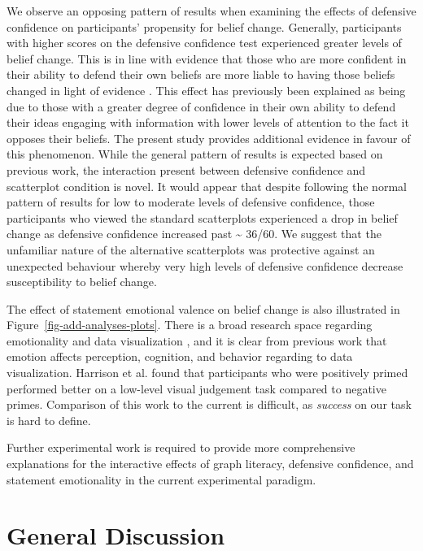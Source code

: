 \documentclass[sigconf]{acmart}
\begin{document}
We observe an opposing pattern of results when examining the effects of
defensive confidence on participants' propensity for belief change.
Generally, participants with higher scores on the defensive confidence
test experienced greater levels of belief change. This is in line with
evidence that those who are more confident in their ability to defend
their own beliefs are more liable to having those beliefs changed in
light of evidence \citep{albarracin_2004}. This effect has previously
been explained as being due to those with a greater degree of confidence
in their own ability to defend their ideas engaging with information
with lower levels of attention to the fact it opposes their beliefs. The
present study provides additional evidence in favour of this phenomenon.
While the general pattern of results is expected based on previous work,
the interaction present between defensive confidence and scatterplot
condition is novel. It would appear that despite following the normal
pattern of results for low to moderate levels of defensive confidence,
those participants who viewed the standard scatterplots experienced a
drop in belief change as defensive confidence increased past
\textasciitilde{} 36/60. We suggest that the unfamiliar nature of the
alternative scatterplots was protective against an unexpected behaviour
whereby very high levels of defensive confidence decrease susceptibility
to belief change.

The effect of statement emotional valence on belief change is also
illustrated in Figure~\ref{fig-add-analyses-plots}. There is a broad
research space regarding emotionality and data visualization
\citep{lan_2023}, and it is clear from previous work that emotion
affects perception, cognition, and behavior
\citep{phelps_2006, harrison_2013, thoresen_2016} regarding to data
visualization. Harrison et al. \citep{harrison_2013} found that
participants who were positively primed performed better on a low-level
visual judgement task compared to negative primes. Comparison of this
work to the current is difficult, as \emph{success} on our task is hard
to define.

Further experimental work is required to provide more comprehensive
explanations for the interactive effects of graph literacy, defensive
confidence, and statement emotionality in the current experimental
paradigm.

\section{General Discussion}\label{sec-general-discussion}
\end{document}
